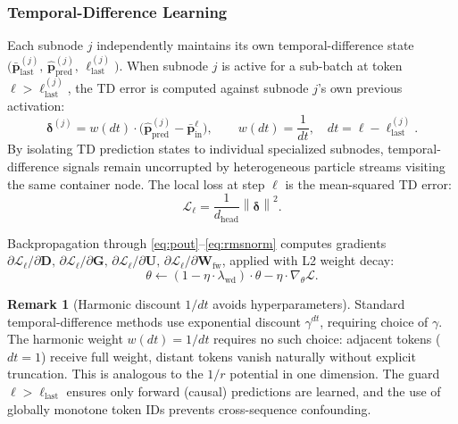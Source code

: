 \documentclass[11pt,a4paper]{article}
\theoremstyle{definition}
\newtheorem{remark}{Remark}[section]
\newcommand{\vp}{\mathbf{p}}
\newcommand{\mW}{\mathbf{W}}
\newcommand{\mG}{\mathbf{G}}
\newcommand{\mU}{\mathbf{U}}
\newcommand{\mD}{\mathbf{D}}
\newcommand{\norm}[1]{\left\lVert #1 \right\rVert}
\begin{document}
\subsubsection{Temporal-Difference Learning}
\label{sec:td}

Each subnode $j$ independently maintains its own temporal-difference state
$\bigl(\bar{\vp}_\text{last}^{(j)},\, \hat{\vp}_\text{pred}^{(j)},\, \ell_\text{last}^{(j)}\bigr)$.
When subnode $j$ is active for a sub-batch at token $\ell > \ell_\text{last}^{(j)}$, the TD error is computed against subnode $j$'s own previous activation:
\begin{equation}
  \boldsymbol{\delta}^{(j)} = w(dt) \cdot \bigl(\hat{\vp}_\text{pred}^{(j)} - \bar{\vp}_\text{in}^\ell\bigr),
  \qquad w(dt) = \frac{1}{dt},\quad dt = \ell - \ell_\text{last}^{(j)}.
  \label{eq:tderror}
\end{equation}
By isolating TD prediction states to individual specialized subnodes, temporal-difference signals remain uncorrupted by heterogeneous particle streams visiting the same container node.
The local loss at step $\ell$ is the mean-squared TD error:
\begin{equation}
  \mathcal{L}_\ell = \frac{1}{d_\text{head}} \norm{\boldsymbol{\delta}}^2.
  \label{eq:loss}
\end{equation}

Backpropagation through \eqref{eq:pout}--\eqref{eq:rmsnorm} computes gradients
$\partial \mathcal{L}_\ell / \partial \mD,\, \partial \mathcal{L}_\ell / \partial \mG,\,
\partial \mathcal{L}_\ell / \partial \mU,\, \partial \mathcal{L}_\ell / \partial \mW_\text{fw}$,
applied with L2 weight decay:
\begin{equation}
  \theta \leftarrow (1 - \eta \cdot \lambda_\text{wd}) \cdot \theta - \eta \cdot \nabla_\theta \mathcal{L}.
  \label{eq:update}
\end{equation}

\begin{remark}[Harmonic discount $1/dt$ avoids hyperparameters]
  Standard temporal-difference methods use exponential discount $\gamma^{dt}$,
  requiring choice of $\gamma$.
  The harmonic weight $w(dt) = 1/dt$ requires no such choice:
  adjacent tokens ($dt=1$) receive full weight, distant tokens vanish naturally without
  explicit truncation. This is analogous to the $1/r$ potential in one dimension.
  The guard $\ell > \ell_\text{last}$ ensures only forward (causal) predictions are learned,
  and the use of globally monotone token IDs prevents cross-sequence confounding.
\end{remark}
\end{document}
